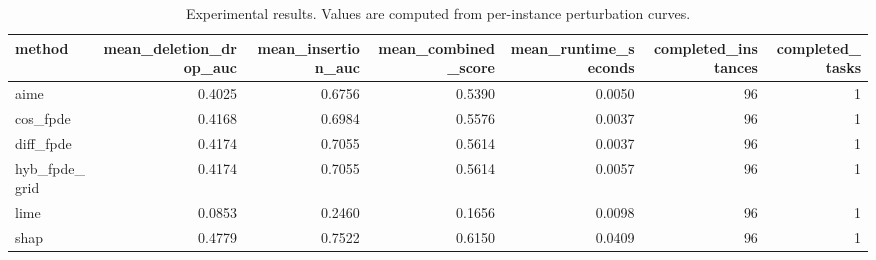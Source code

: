 \begin{table}[t]
\caption{Experimental results. Values are computed from per-instance perturbation curves.}
\label{tab:main_results_computed}
\centering
\begin{tabular}{lrrrrrr}
\toprule
method & mean\_deletion\_drop\_auc & mean\_insertion\_auc & mean\_combined\_score & mean\_runtime\_seconds & completed\_instances & completed\_tasks \\
\midrule
aime & 0.4025 & 0.6756 & 0.5390 & 0.0050 & 96 & 1 \\
cos\_fpde & 0.4168 & 0.6984 & 0.5576 & 0.0037 & 96 & 1 \\
diff\_fpde & 0.4174 & 0.7055 & 0.5614 & 0.0037 & 96 & 1 \\
hyb\_fpde\_grid & 0.4174 & 0.7055 & 0.5614 & 0.0057 & 96 & 1 \\
lime & 0.0853 & 0.2460 & 0.1656 & 0.0098 & 96 & 1 \\
shap & 0.4779 & 0.7522 & 0.6150 & 0.0409 & 96 & 1 \\
\bottomrule
\end{tabular}

\end{table}
